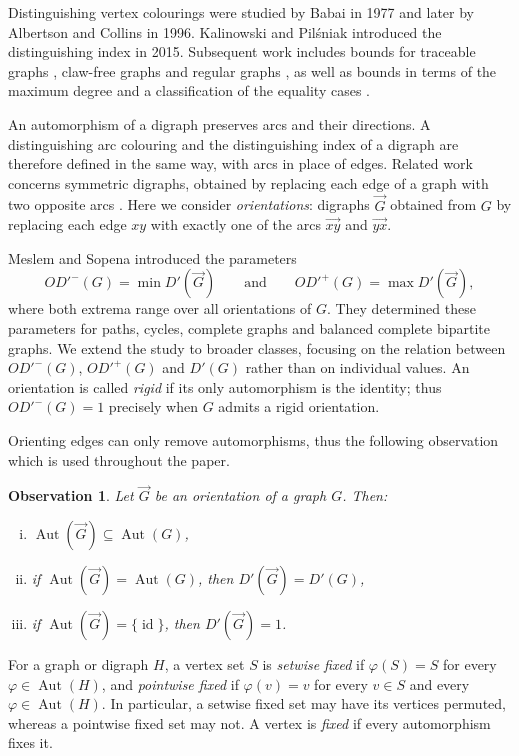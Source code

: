 \documentclass[a4paper,12pt]{elsarticle}
\newtheorem{observation}[theorem]{Observation}
\newcommand{\Aut}{\ensuremath{\operatorname{Aut}}}
\newcommand{\id}{\ensuremath{\operatorname{id}}}
\newcommand{\orG}{\ensuremath{\overrightarrow{G}}}
\begin{document}
Distinguishing vertex colourings were studied by Babai \cite{Babai} in 1977 and later by Albertson and Collins \cite{AlbertsonCollins} in 1996. Kalinowski and Pil\'sniak \cite{KalinowskiPilsniak} introduced the distinguishing index in 2015. Subsequent work includes bounds for traceable graphs \cite{Pilsniak_traceable}, claw-free graphs \cite{GorzkowskaKargul} and regular graphs \cite{KwasnyStawiski_regular}, as well as bounds in terms of the maximum degree and a classification of the equality cases \cite{Pilsniak_traceable}.

An automorphism of a digraph preserves arcs and their directions. A distinguishing arc colouring and the distinguishing index of a digraph are therefore defined in the same way, with arcs in place of edges. Related work concerns symmetric digraphs, obtained by replacing each edge of a graph with two opposite arcs \cite{KalinowskiPilsniak2,KalinowskiPilsniakProrok}. Here we consider \emph{orientations}: digraphs $\orG$ obtained from $G$ by replacing each edge $xy$ with exactly one of the arcs $\overrightarrow{xy}$ and $\overrightarrow{yx}$.

Meslem and Sopena \cite{MeslemSopena} introduced the parameters
\[
OD'^-(G)=\min D'(\orG)
\qquad\text{and}\qquad
OD'^+(G)=\max D'(\orG),
\]
where both extrema range over all orientations of $G$. They determined these parameters for paths, cycles, complete graphs and balanced complete bipartite graphs. We extend the study to broader classes, focusing on the relation between $OD'^-(G)$, $OD'^+(G)$ and $D'(G)$ rather than on individual values. An orientation is called \emph{rigid} if its only automorphism is the identity; thus $OD'^-(G)=1$ precisely when $G$ admits a rigid orientation.

Orienting edges can only remove automorphisms, thus the following observation which is used throughout the paper.

\begin{observation} \label{obs: equal_aut}
Let $\orG$ be an orientation of a graph $G$. Then:
\begin{enumerate}[(i)]
\item $\Aut(\orG) \subseteq \Aut(G)$,
\item if $\Aut(\orG) = \Aut(G)$, then $D'(\orG) = D'(G)$,
\item if $\Aut(\orG) = \{\id\}$, then $D'(\orG) = 1$.
\end{enumerate}
\end{observation}

For a graph or digraph $H$, a vertex set $S$ is \emph{setwise fixed} if $\varphi(S)=S$ for every $\varphi\in\Aut(H)$, and \emph{pointwise fixed} if $\varphi(v)=v$ for every $v\in S$ and every $\varphi\in\Aut(H)$. In particular, a setwise fixed set may have its vertices permuted, whereas a pointwise fixed set may not. A vertex is \emph{fixed} if every automorphism fixes it.
\end{document}

